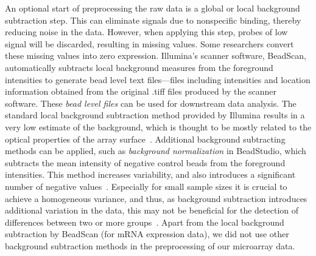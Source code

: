 An optional start of preprocessing the raw data is a global or local background subtraction step. This can eliminate signals due to nonspecific binding, thereby reducing noise in the data. However, when applying this step, probes of low signal will be discarded, resulting in missing values. Some researchers convert these missing values into zero expression. Illumina's scanner software, BeadScan, automatically subtracts local background measures from the foreground intensities to generate bead level text files---files including intensities and location information obtained from the original .tiff files produced by the scanner software. These {\it bead level files} can be used for downstream data analysis. The standard local background subtraction method provided by Illumina results in a very low estimate of the background, which is thought to be mostly related to the optical properties of the array surface~\cite{dunning2008statistical}. Additional background subtracting methods can be applied, such as {\it background normalization} in BeadStudio, which subtracts the mean intensity of negative control beads from the foreground intensities. This method increases variability, and also introduces a significant number of negative values~\cite{dunning2008statistical}. Especially for small sample sizes it is crucial to achieve a homogeneous variance, and thus, as background subtraction introduces additional variation in the data, this may not be beneficial for the detection of differences between two or more groups~\cite{schmid2010comparison}. Apart from the local background subtraction by BeadScan (for mRNA expression data), we did not use other background subtraction methods in the preprocessing of our microarray data.

